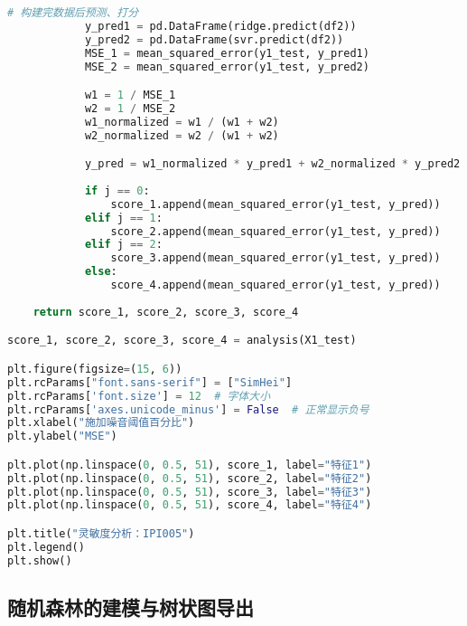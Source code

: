 \begin{lstlisting}[language=Python]
            # 构建完数据后预测、打分
            y_pred1 = pd.DataFrame(ridge.predict(df2))
            y_pred2 = pd.DataFrame(svr.predict(df2))
            MSE_1 = mean_squared_error(y1_test, y_pred1)
            MSE_2 = mean_squared_error(y1_test, y_pred2)

            w1 = 1 / MSE_1
            w2 = 1 / MSE_2
            w1_normalized = w1 / (w1 + w2)
            w2_normalized = w2 / (w1 + w2)

            y_pred = w1_normalized * y_pred1 + w2_normalized * y_pred2
        
            if j == 0:
                score_1.append(mean_squared_error(y1_test, y_pred))
            elif j == 1:
                score_2.append(mean_squared_error(y1_test, y_pred))
            elif j == 2:
                score_3.append(mean_squared_error(y1_test, y_pred))
            else:
                score_4.append(mean_squared_error(y1_test, y_pred))
    
    return score_1, score_2, score_3, score_4

score_1, score_2, score_3, score_4 = analysis(X1_test)

plt.figure(figsize=(15, 6))
plt.rcParams["font.sans-serif"] = ["SimHei"]
plt.rcParams['font.size'] = 12  # 字体大小
plt.rcParams['axes.unicode_minus'] = False  # 正常显示负号
plt.xlabel("施加噪音阈值百分比")
plt.ylabel("MSE")

plt.plot(np.linspace(0, 0.5, 51), score_1, label="特征1")
plt.plot(np.linspace(0, 0.5, 51), score_2, label="特征2")
plt.plot(np.linspace(0, 0.5, 51), score_3, label="特征3")
plt.plot(np.linspace(0, 0.5, 51), score_4, label="特征4")

plt.title("灵敏度分析：IPI005")
plt.legend()
plt.show()
\end{lstlisting}



\subsection{随机森林的建模与树状图导出}


